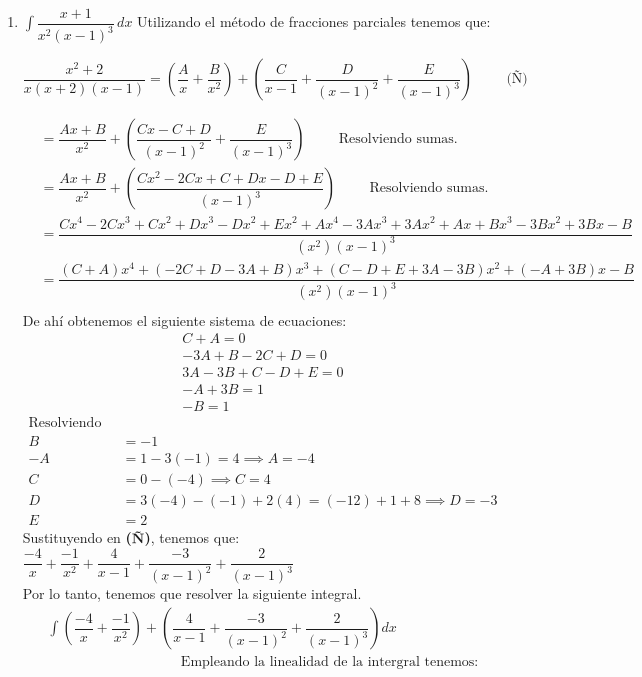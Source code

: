 \documentclass[letterpaper]{article}
\renewcommand{\*}{\cdot}
\theoremstyle{definition}
\begin{document}
\begin{enumerate}
\begin{enumerate}
\item$\displaystyle \int \dfrac{x + 1}{x^2(x-1)^3} \, dx$
Utilizando el método de fracciones parciales tenemos que:\\
\begin{center}
	$\dfrac{x^2 +2}{x(x+2)(x-1)}= (\dfrac{A}{x}+\dfrac{B}{x^2})+(\dfrac{C}{x-1}+\dfrac{D}{(x-1)^2}+\dfrac{E}{(x-1)^3})\hspace{1cm}{\textbf{(Ñ)}}$
\end{center}
\begin{align*}
&=\dfrac{Ax+B}{x^2}+(\dfrac{Cx-C+D}{(x-1)^2}+\dfrac{E}{(x-1)^3})\hspace{1cm}\text{Resolviendo sumas.}\\
&=\dfrac{Ax+B}{x^2}+(\dfrac{Cx^2-2Cx+C+Dx-D+E}{(x-1)^3})\hspace{1cm}\text{Resolviendo sumas.}\\
&=\dfrac{Cx^4-2Cx^3+Cx^2+Dx^3-Dx^2+Ex^2+Ax^4-3Ax^3+3Ax^2+Ax+Bx^3-3Bx^2+3Bx-B}{(x^2)(x-1)^3}\\
&= \dfrac{(C+A)x^4+(-2C+D-3A+B)x^3+(C-D+E+3A-3B)x^2+(-A+3B)x-B}{(x^2)(x-1)^3} \\
\end{align*}
De ahí obtenemos el siguiente sistema de ecuaciones:
\begin{align*}
C+A = 0\\
-3A+B-2C+D = 0\\
3A-3B+C-D+E = 0\\
-A+3B = 1\\
-B = 1
\end{align*}
\begin{align*}
\text{Resolviendo este sistema, tenemos que:}\\
B &= -1\\
-A &= 1-3(-1) = 4 \implies A = -4\\
C &= 0-(-4) \implies C=4\\
D &= 3(-4)-(-1)+2(4) = (-12)+1+8 \implies D = -3\\
E &= 2
\end{align*}
Sustituyendo en \textbf{(Ñ)}, tenemos que: $\dfrac{-4}{x}+\dfrac{-1}{x^2}+\dfrac{4}{x-1}+\dfrac{-3}{(x-1)^2}+\dfrac{2}{(x-1)^3}$\\
Por lo tanto, tenemos que resolver la siguiente integral.
\begin{align*}
\int(\dfrac{-4}{x}+\dfrac{-1}{x^2})+(\dfrac{4}{x-1}+\dfrac{-3}{(x-1)^2}+\dfrac{2}{(x-1)^3}) dx\\
\hspace{4cm}\text{Empleando la linealidad de la intergral tenemos:}\\

\end{align*}
\end{enumerate}
\end{enumerate}
\end{document}
